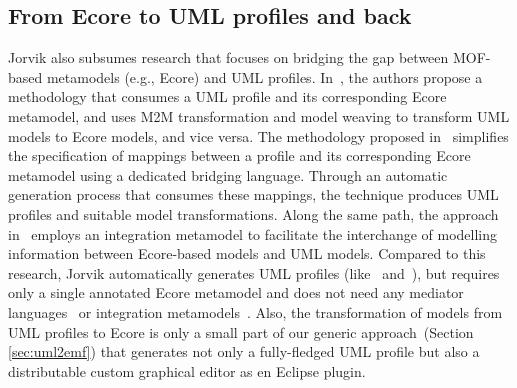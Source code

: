 \subsection{From Ecore to UML profiles and back}
Jorvik also subsumes research that focuses on bridging the gap between 
MOF-based metamodels (e.g., Ecore) and UML profiles.
In~\cite{abouzahra2005practical}, the authors propose a methodology 
that consumes a UML profile and its corresponding Ecore metamodel, and uses
M2M transformation and model weaving to transform UML models to 
Ecore models, and vice versa. The methodology proposed 
in~\cite{Wimmer2009:IJWIS} simplifies the specification of mappings 
between a profile and its corresponding Ecore metamodel using a dedicated 
bridging language. Through an automatic generation process that consumes
these mappings, the technique produces UML profiles and suitable model 
transformations. 
Along the same path, the approach in~\cite{Giachetti2009:ICRCIS} employs an 
integration metamodel to facilitate the interchange of modelling information 
between Ecore-based models and UML models. Compared to this research, Jorvik automatically generates UML 
profiles (like~\cite{Wimmer2009:IJWIS} 
and~\cite{Giachetti2009:ICRCIS}), but requires only a single annotated Ecore 
metamodel and does not need any mediator 
languages~\cite{Wimmer2009:IJWIS} 
or integration metamodels~\cite{Giachetti2009:ICRCIS}. Also, the transformation 
of models from UML profiles to Ecore is only a small part of our generic 
approach~(Section \ref{sec:uml2emf}) that generates not only a fully-fledged 
UML profile but also a distributable custom graphical editor as en Eclipse plugin. 

 




